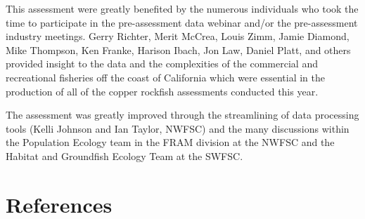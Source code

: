 \documentclass[11pt,
  english,
  letterpaper,
]{article}
\begin{document}
This assessment were greatly benefited by the numerous individuals who took the time to participate in the pre-assessment data webinar and/or the pre-assessment industry meetings. Gerry Richter, Merit McCrea, Louis Zimm, Jamie Diamond, Mike Thompson, Ken Franke, Harison Ibach, Jon Law, Daniel Platt, and others provided insight to the data and the complexities of the commercial and recreational fisheries off the coast of California which were essential in the production of all of the copper rockfish assessments conducted this year.

The assessment was greatly improved through the streamlining of data processing tools (Kelli Johnson and Ian Taylor, NWFSC) and the many discussions within the Population Ecology team in the FRAM division at the NWFSC and the Habitat and Groundfish Ecology Team at the SWFSC.

\clearpage

\hypertarget{references}{%
\section{References}\label{references}}
\end{document}
